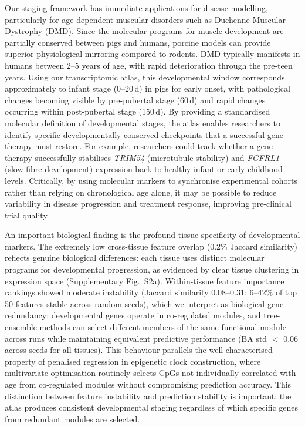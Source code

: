 \documentclass[10pt,a4paper]{article}
\begin{document}
Our staging framework has immediate applications for disease modelling, particularly for age-dependent muscular disorders such as Duchenne Muscular Dystrophy (DMD)\cite{klymiuk_dystrophin-deficient_2013, selsby_porcine_2015}. Since the molecular programs for muscle development are partially conserved between pigs and humans, porcine models can provide superior physiological mirroring compared to rodents. DMD typically manifests in humans between 2--5 years of age\cite{bushby_diagnosis_2010}, with rapid deterioration through the pre-teen years. Using our transcriptomic atlas, this developmental window corresponds approximately to infant stage (0--20\,d) in pigs for early onset, with pathological changes becoming visible by pre-pubertal stage (60\,d) and rapid changes occurring within post-pubertal stage (150\,d). By providing a standardised molecular definition of developmental stages, the atlas enables researchers to identify specific developmentally conserved checkpoints that a successful gene therapy must restore. For example, researchers could track whether a gene therapy successfully stabilises \textit{TRIM54} (microtubule stability) and \textit{FGFRL1} (slow fibre development) expression back to healthy infant or early childhood levels. Critically, by using molecular markers to synchronise experimental cohorts rather than relying on chronological age alone, it may be possible to reduce variability in disease progression and treatment response, improving pre-clinical trial quality.

An important biological finding is the profound tissue-specificity of developmental markers. The extremely low cross-tissue feature overlap (0.2\% Jaccard similarity) reflects genuine biological differences: each tissue uses distinct molecular programs for developmental progression, as evidenced by clear tissue clustering in expression space (Supplementary Fig.~S2a). Within-tissue feature importance rankings showed moderate instability (Jaccard similarity 0.08--0.31; 6--42\% of top 50 features stable across random seeds), which we interpret as biological gene redundancy: developmental genes operate in co-regulated modules, and tree-ensemble methods can select different members of the same functional module across runs while maintaining equivalent predictive performance (BA std $<$ 0.06 across seeds for all tissues). This behaviour parallels the well-characterised property of penalised regression in epigenetic clock construction, where multivariate optimisation routinely selects CpGs not individually correlated with age from co-regulated modules without compromising prediction accuracy\cite{teschendorff_epigenetic_2025}. This distinction between feature instability and prediction stability is important: the atlas produces consistent developmental staging regardless of which specific genes from redundant modules are selected.
\end{document}
